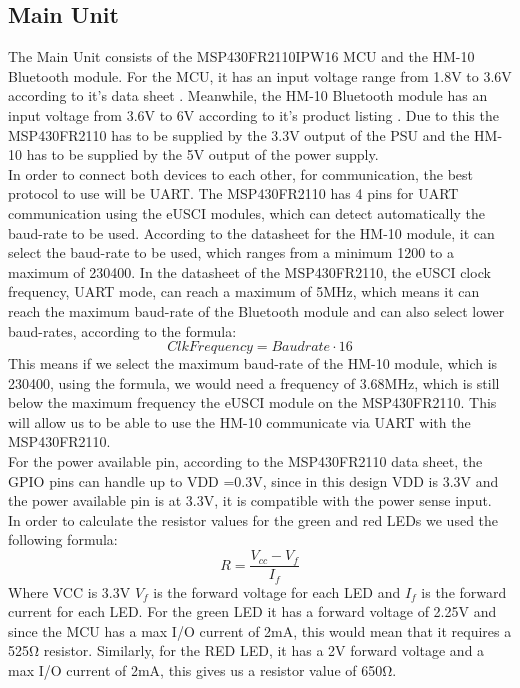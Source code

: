 \subsection{Main Unit}
The Main Unit consists of the MSP430FR2110IPW16 MCU and the HM-10 Bluetooth module. For the MCU, it has an input voltage range from 1.8\si{\V} to 3.6\si{\V} according to it's data sheet \cite{MSP430FR2110IPW16R}. Meanwhile, the HM-10 Bluetooth module has an input voltage from 3.6\si{\V} to 6\si{\V} according to it's product listing \cite{AmazonComHiLetgo}. Due to this the MSP430FR2110 has to be supplied by the 3.3\si{V} output of the PSU and the HM-10 has to be supplied by the 5\si{\V} output of the power supply.\\
In order to connect both devices to each other, for communication, the best protocol to use will be UART. The MSP430FR2110 has 4 pins for UART communication using the eUSCI modules, which can detect automatically the baud-rate to be used. According to the datasheet for the HM-10 module\cite{AmazonComHiLetgo}, it can select the baud-rate to be used, which ranges from a minimum 1200 to a maximum of 230400. In the datasheet of the MSP430FR2110, the eUSCI clock frequency, UART mode, can reach a maximum of 5MHz, which means it can reach the maximum baud-rate of the Bluetooth module and can also select lower baud-rates, according to the formula:
\begin{equation}
	Clk Frequency = Baudrate \cdot 16
	\label{eq:UART Frequency}
\end{equation}
This means if we select the maximum baud-rate of the HM-10 module, which is 230400, using the formula, we would need a frequency of 3.68MHz, which is still below the maximum frequency the eUSCI module on the MSP430FR2110. This will allow us to be able to use the HM-10 communicate via UART with the MSP430FR2110.\\
For the power available pin, according to the MSP430FR2110 data sheet, the GPIO pins can handle up to VDD =0.3\si{\V}, since in this design VDD is 3.3\si{\V} and the power available pin is at 3.3\si{\V}, it is compatible with the power sense input.\\
In order to calculate the resistor values for the green and red LEDs we used the following formula:
\begin{equation}
R = \frac{V_{cc} - V_{f}}{I_{f}}
\end{equation}
Where VCC is 3.3\si{\V} $V_{f}$ is the forward voltage for each LED and $I_{f}$ is the forward current for each LED. For the green LED \cite{GreenDiffused5mmStandard} it has a forward voltage of 2.25\si{\V} and since the MCU has a max I/O current of 2\si{\mA}, this would mean that it requires a 525\si{\ohm} resistor. Similarly, for the RED LED, it has a 2\si{\V} forward voltage and a max I/O current of 2\si{\mA}, this gives us a resistor value of  650\si{\ohm}.\\\\
